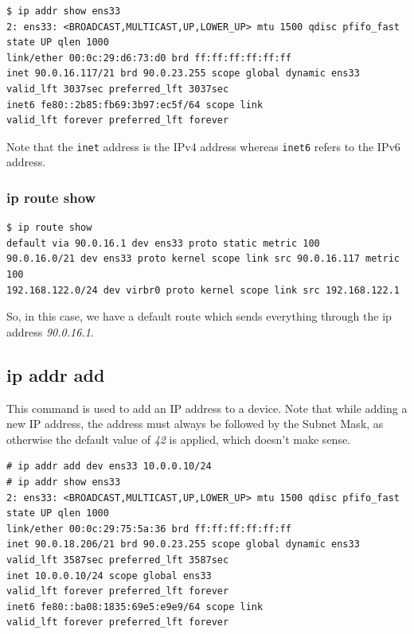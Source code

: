 \vspace{-15pt}
\begin{verbatim}
$ ip addr show ens33
2: ens33: <BROADCAST,MULTICAST,UP,LOWER_UP> mtu 1500 qdisc pfifo_fast state UP qlen 1000
link/ether 00:0c:29:d6:73:d0 brd ff:ff:ff:ff:ff:ff
inet 90.0.16.117/21 brd 90.0.23.255 scope global dynamic ens33
valid_lft 3037sec preferred_lft 3037sec
inet6 fe80::2b85:fb69:3b97:ec5f/64 scope link 
valid_lft forever preferred_lft forever
\end{verbatim}
\vspace{-10pt}

\noindent
Note that the \verb|inet| address is the IPv4 address whereas \verb|inet6| refers to the IPv6 address. 

\subsubsection{ip route show} \vspace{-10pt}

\vspace{-15pt}
\begin{verbatim}
$ ip route show
default via 90.0.16.1 dev ens33 proto static metric 100 
90.0.16.0/21 dev ens33 proto kernel scope link src 90.0.16.117 metric 100 
192.168.122.0/24 dev virbr0 proto kernel scope link src 192.168.122.1 
\end{verbatim}
\vspace{-10pt}

\noindent
So, in this case, we have a default route which sends everything through the ip address \textit{90.0.16.1}. 

\subsection{ip addr add}
This command is used to add an IP address to a device. Note that while adding a new IP address, the address must always be followed by the Subnet Mask, as otherwise the default value of \textit{42} is applied, which doesn't make sense. 

\vspace{-15pt}
\begin{verbatim}
# ip addr add dev ens33 10.0.0.10/24
# ip addr show ens33
2: ens33: <BROADCAST,MULTICAST,UP,LOWER_UP> mtu 1500 qdisc pfifo_fast state UP qlen 1000
link/ether 00:0c:29:75:5a:36 brd ff:ff:ff:ff:ff:ff
inet 90.0.18.206/21 brd 90.0.23.255 scope global dynamic ens33
valid_lft 3587sec preferred_lft 3587sec
inet 10.0.0.10/24 scope global ens33
valid_lft forever preferred_lft forever
inet6 fe80::ba08:1835:69e5:e9e9/64 scope link 
valid_lft forever preferred_lft forever
\end{verbatim}
\vspace{-10pt}

